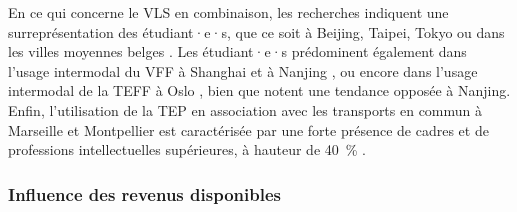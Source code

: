 \begin{refsegment}
En ce qui concerne le \acrshort{VLS} en combinaison, les recherches indiquent une surreprésentation des étudiant·e·s, que ce soit à Beijing, Taipei, Tokyo \textcolor{blue}{\autocite[215]{lin_built_2018}} ou dans les villes moyennes belges \textcolor{blue}{\autocite[8]{adnan_last-mile_2019}}. Les étudiant·e·s prédominent également dans l'usage intermodal du \acrshort{VFF} à Shanghai \textcolor{blue}{\autocite[12]{hu_examining_2022}} et à Nanjing \textcolor{blue}{\autocite[5]{cheng_comparison_2023}}, ou encore dans l'usage intermodal de la \acrshort{TEFF} à Oslo \textcolor{blue}{\autocite[3-4]{fearnley_patterns_2020}}, bien que \textcolor{blue}{\textcite[13]{liu_use_2020}} notent une tendance opposée à Nanjing. Enfin, l'utilisation de la \acrshort{TEP} en association avec les transports en commun à Marseille et Montpellier est caractérisée par une forte présence de cadres et de professions intellectuelles supérieures, à hauteur de 40~\% \textcolor{blue}{\autocite[12]{pages_nouveaux_2021}}.%

\subsubsection*{Influence des revenus disponibles
    \label{chap2:revenus}
    }
    

\end{refsegment}
